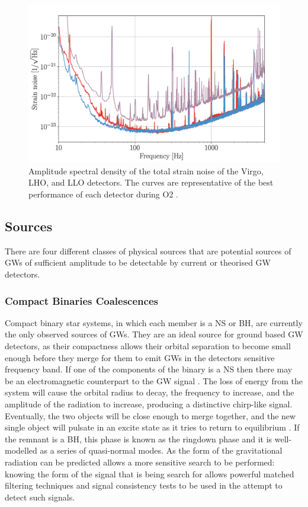 \documentclass[binding=0.6cm, LaM]{sapthesis}
\begin{document}
        \begin{figure}[t]
          \includegraphics[scale=0.6]{noise1}
          \centering
          \caption{Amplitude spectral density of the total strain noise  of the Virgo, LHO, and LLO detectors. The curves are representative of the best performance of each detector during O2 \cite{13}.}
          \label{fig:noise1}
        \end{figure}

\subsection{Sources}
\label{sec:sources}
	There are four different classes of physical sources 
	that are potential sources of GWs 
	of sufficient amplitude to be detectable 
	by current or theorised GW detectors. 

\subsubsection{Compact Binaries Coalescences}
	Compact binary star systems, in which each member is a NS or BH, 
	are currently the only observed sources of GWs.
	They are an ideal source for ground based GW detectors, 
	as their compactness allows their orbital separation to become 
	small enough before they merge for them to emit GWs in the detectors sensitive frequency band.
	If one of the components of the binary is a NS 
	then there may be an electromagnetic counterpart to the GW signal \cite{20}. 
	The loss of energy from the system will cause the orbital radius to decay, 
	the frequency to increase, and the amplitude of the radiation to increase, 
	producing a distinctive chirp-like signal. 
	Eventually, the two objects will be close enough to merge together, 
	and the new single object will pulsate in an excite state as it tries to return to equilibrium \cite{21}. 
	If the remnant is a BH, this phase is known as the ringdown phase and it is well-modelled as a series of quasi-normal modes. 
	As the form of the gravitational radiation can be predicted allows 
	a more sensitive search to be performed: knowing the form of the signal 
	that is being search for allows powerful matched filtering techniques 
	and signal consistency tests to be used in the attempt to detect such signals.
\end{document}
